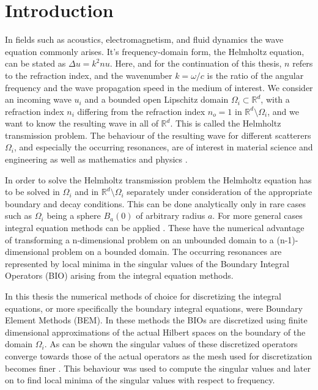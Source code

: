 \documentclass[a4paper, oneside]{discothesis}
\begin{document}
\chapter{Introduction}
In fields such as acoustics, electromagnetism, and fluid dynamics the wave equation commonly arises. 
It's frequency-domain form, the Helmholtz equation, can be stated as $ \Delta u = k^2 n u $. 
Here, and for the continuation of this thesis, $n$ refers to the refraction index, and the wavenumber $k=\omega/c$ is the ratio of the angular frequency and the wave propagation speed in the medium of interest.
We consider an incoming wave $u_i$ and a bounded open Lipschitz domain $\Omega_i \subset \mathbb{R}^d$, with a refraction index $n_i$ differing from the refraction index $n_o=1$ in $\mathbb{R}^d\setminus\Omega_i$, and we want to know the resulting wave in all of $\mathbb{R}^d$. 
This is called the Helmholtz transmission problem.
The behaviour of the resulting wave for different scatterers $\Omega_i$, and especially the occurring resonances, are of interest in material science and engineering as well as mathematics and physics \cite{PhysRevLett.97.206806} \cite{matscat} \cite{emscat}.

In order to solve the Helmholtz transmission problem the Helmholtz equation has to be solved in $\Omega_i$ and in $\mathbb{R}^d\setminus\Omega_i$ separately under consideration of the appropriate boundary and decay conditions.
This can be done analytically only in rare cases such as $\Omega_i$ being a sphere $B_{a}(0)$ of arbitrary radius $a$. 
For more general cases integral equation methods can be applied \cite{doi:10.1137/1.9781611973167}. 
These have the numerical advantage of transforming a n-dimensional problem on an unbounded domain to a (n-1)-dimensional problem on a bounded domain. 
The occurring resonances are represented by local minima in the singular values of the Boundary Integral Operators (BIO) arising from the integral equation methods.

In this thesis the numerical methods of choice for discretizing the integral equations, or more specifically the boundary integral equations, were Boundary Element Methods (BEM).
In these methods the BIOs are discretized using finite dimensional approximations of the actual Hilbert spaces on the boundary of the domain $\Omega_i$.
As can be shown the singular values of these discretized operators converge towards those of the actual operators as the mesh used for discretization becomes finer \cite{svdap}.
This behaviour was used to compute the singular values and later on to find local minima of the singular values with respect to frequency.
\end{document}
